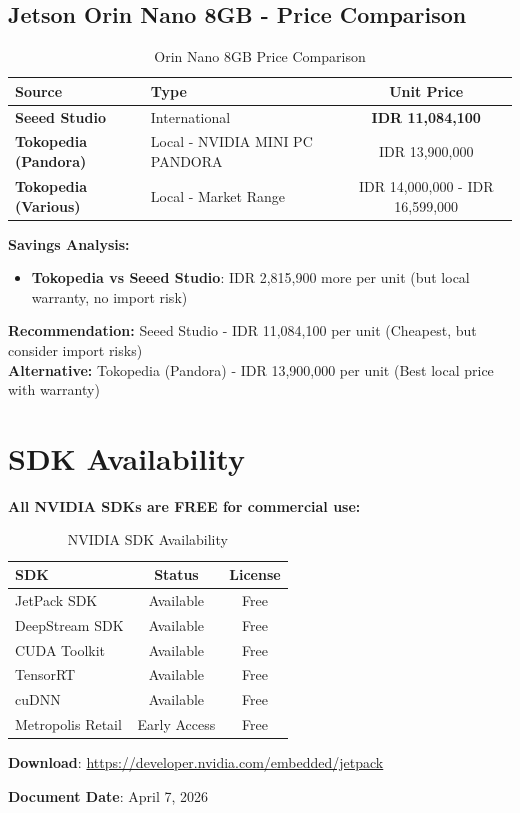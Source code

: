 \documentclass[12pt,a4paper]{article}
\begin{document}
\subsection{Jetson Orin Nano 8GB - Price Comparison}

\begin{table}[h!]
\centering
\small
\begin{tabularx}{\textwidth}{l X c}
\toprule
\textbf{Source} & \textbf{Type} & \textbf{Unit Price} \\
\midrule
\textbf{Seeed Studio} & International & \textbf{IDR 11,084,100} \\
\textbf{Tokopedia (Pandora)} & Local - NVIDIA MINI PC PANDORA & IDR 13,900,000 \\
\textbf{Tokopedia (Various)} & Local - Market Range & IDR 14,000,000 - IDR 16,599,000 \\
\bottomrule
\end{tabularx}
\caption{Orin Nano 8GB Price Comparison}
\end{table}

\textbf{Savings Analysis:}
\begin{itemize}
    \item \textbf{Tokopedia vs Seeed Studio}: IDR 2,815,900 more per unit (but local warranty, no import risk)
\end{itemize}

\textbf{Recommendation:} Seeed Studio - IDR 11,084,100 per unit (Cheapest, but consider import risks)\\
\textbf{Alternative:} Tokopedia (Pandora) - IDR 13,900,000 per unit (Best local price with warranty)

\section{SDK Availability}

\textbf{All NVIDIA SDKs are FREE for commercial use:}

\begin{table}[h!]
\centering
\begin{tabular}{l c c}
\toprule
\textbf{SDK} & \textbf{Status} & \textbf{License} \\
\midrule
JetPack SDK & Available & Free \\
DeepStream SDK & Available & Free \\
CUDA Toolkit & Available & Free \\
TensorRT & Available & Free \\
cuDNN & Available & Free \\
Metropolis Retail & Early Access & Free \\
\bottomrule
\end{tabular}
\caption{NVIDIA SDK Availability}
\end{table}

\textbf{Download}: \url{https://developer.nvidia.com/embedded/jetpack}

\vspace{1cm}

\noindent\textbf{Document Date}: April 7, 2026
\end{document}
